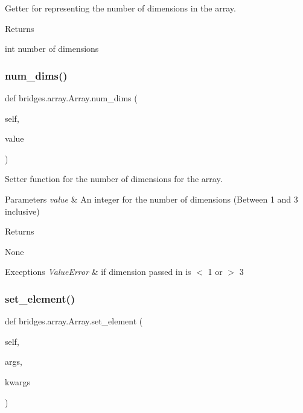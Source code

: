 Getter for representing the number of dimensions in the array. 

\begin{DoxyReturn}{Returns}


int number of dimensions 
\end{DoxyReturn}
\mbox{\label{classbridges_1_1array_1_1_array_ab7374f0d4bb0a9514b4af29bdd8935a5}} 
\subsubsection{\texorpdfstring{num\+\_\+dims()}{num\_dims()}\hspace{0.1cm}{\footnotesize\ttfamily [2/2]}}
{\footnotesize\ttfamily def bridges.\+array.\+Array.\+num\+\_\+dims (\begin{DoxyParamCaption}\item[{}]{self,  }\item[{}]{value }\end{DoxyParamCaption})}



Setter function for the number of dimensions for the array. 


\begin{DoxyParams}{Parameters}
{\em value} & An integer for the number of dimensions (Between 1 and 3 inclusive) \\
\hline
\end{DoxyParams}
\begin{DoxyReturn}{Returns}


None
\end{DoxyReturn}

\begin{DoxyExceptions}{Exceptions}
{\em Value\+Error} & if dimension passed in is $<$ 1 or $>$ 3 \\
\hline
\end{DoxyExceptions}
\mbox{\label{classbridges_1_1array_1_1_array_a371bbcb9aa75562a2c3f04ef1bb33faf}} 
\subsubsection{\texorpdfstring{set\+\_\+element()}{set\_element()}}
{\footnotesize\ttfamily def bridges.\+array.\+Array.\+set\+\_\+element (\begin{DoxyParamCaption}\item[{}]{self,  }\item[{}]{args,  }\item[{}]{kwargs }\end{DoxyParamCaption})}



